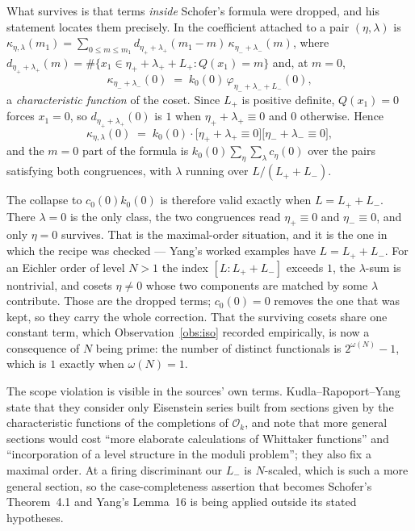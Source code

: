 \documentclass[11pt,reqno]{amsart}
\theoremstyle{plain}
\theoremstyle{definition}
\begin{document}
What survives is that terms \emph{inside} Schofer's formula were dropped, and his statement locates
them precisely. In \cite[Thm.~3.3]{SchoferThesis} the coefficient attached to a pair
$(\eta,\lambda)$ is
$\kappa_{\eta,\lambda}(m_1)=\sum_{0\le m\le m_1}d_{\eta_++\lambda_+}(m_1-m)\,
\kappa_{\eta_-+\lambda_-}(m)$, where $d_{\eta_++\lambda_+}(m)=\#\{x_1\in\eta_++\lambda_++L_+:
Q(x_1)=m\}$ and, at $m=0$,
\[
  \kappa_{\eta_-+\lambda_-}(0)\;=\;k_0(0)\,\varphi_{\eta_-+\lambda_-+L_-}(0),
\]
a \emph{characteristic function} of the coset. Since $L_+$ is positive definite, $Q(x_1)=0$ forces
$x_1=0$, so $d_{\eta_++\lambda_+}(0)$ is $1$ when $\eta_++\lambda_+\equiv0$ and $0$ otherwise.
Hence
\[
  \kappa_{\eta,\lambda}(0)\;=\;k_0(0)\cdot
  \bigl[\eta_++\lambda_+\equiv0\bigr]\bigl[\eta_-+\lambda_-\equiv0\bigr],
\]
and the $m=0$ part of the formula is $k_0(0)\sum_{\eta}\sum_{\lambda}c_\eta(0)$ over the pairs
satisfying both congruences, with $\lambda$ running over $L/(L_++L_-)$.

The collapse to $c_0(0)k_0(0)$ is therefore valid exactly when $L=L_++L_-$. There
$\lambda=0$ is the only class, the two congruences read $\eta_+\equiv0$ and $\eta_-\equiv0$, and
only $\eta=0$ survives. That is the maximal-order situation, and it is the one in which the recipe
was checked --- Yang's worked examples have $L=L_++L_-$. For an Eichler order of level $N>1$ the
index $[L:L_++L_-]$ exceeds $1$, the $\lambda$-sum is nontrivial, and cosets $\eta\neq0$ whose two
components are matched by some $\lambda$ contribute. Those are the dropped terms; $c_0(0)=0$
removes the one that was kept, so they carry the whole correction. That the surviving cosets share
one constant term, which Observation~\ref{obs:iso} recorded empirically, is now a consequence of
$N$ being prime: the number of distinct functionals is $2^{\omega(N)}-1$, which is $1$ exactly when
$\omega(N)=1$.

The scope violation is visible in the sources' own terms. Kudla--Rapoport--Yang state that they
consider only Eisenstein series built from sections given by the characteristic functions of the
completions of $\mathcal{O}_k$, and note that more general sections would cost ``more elaborate
calculations of Whittaker functions'' and ``incorporation of a level structure in the moduli
problem''; they also fix a maximal order. At a firing discriminant our $L_-$ is $N$-scaled, which is
such a more general section, so the case-completeness assertion that becomes Schofer's Theorem~4.1
and Yang's Lemma~16 is being applied outside its stated hypotheses.
\end{document}

